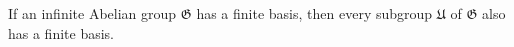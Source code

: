 If an infinite Abelian group $\mathfrak{G}$ has a finite basis, then every subgroup $\mathfrak{U}$ of $\mathfrak{G}$ also has a finite basis.
